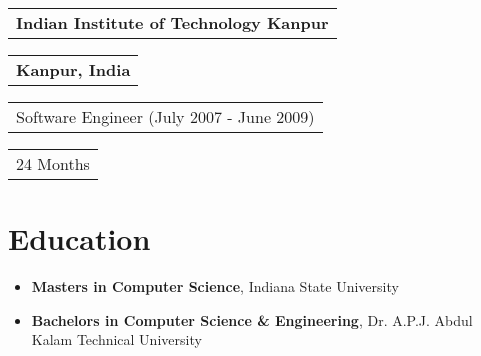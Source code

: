\documentclass[letterpaper,11pt]{article}
\begin{document}

    \vspace{0.25cm}
    \noindent
    \begin{tabular}[t]{@{}l}
    \textbf{Indian Institute of Technology Kanpur}
    \end{tabular}
    \hfill
    \begin{tabular}[t]{l@{}}
    \textbf{Kanpur, India}
    \end{tabular}
    \noindent\newline
    \begin{tabular}[t]{@{}l}
    Software Engineer (July 2007 - June 2009)
    \end{tabular}
    \hfill
    \begin{tabular}[t]{l@{}}
    24 Months
    \end{tabular}
    
    \section{Education}
    \begin{itemize}
    	\item \textbf{Masters in Computer Science}, Indiana State University
    	\item \textbf{Bachelors in Computer Science \& Engineering}, Dr. A.P.J. Abdul Kalam Technical University
    \end{itemize}
    
    
    
\end{document}
